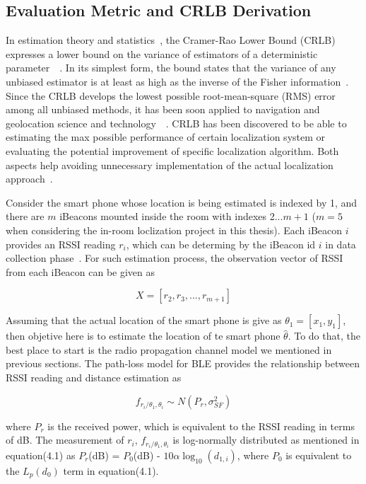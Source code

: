 \documentclass[12pt]{report}
\begin{document}
\subsection{Evaluation Metric and CRLB Derivation}
In estimation theory and statistics~\cite{gen15b}, the Cramer-Rao Lower Bound (CRLB) expresses a lower bound on the variance of estimators of a deterministic parameter~\cite{tre}~\cite{poo}. In its simplest form, the bound states that the variance of any unbiased estimator is at least as high as the inverse of the Fisher information~\cite{poo}. Since the CRLB develops the lowest possible root-mean-square (RMS) error among all unbiased methods, it has been soon applied to navigation and geolocation science and technology~\cite{pat05}~\cite{gus}. CRLB has been discovered to be able to estimating the max possible performance of certain localization system or evaluating the potential improvement of specific localization algorithm. Both aspects help avoiding unnecessary implementation of the actual localization approach~\cite{pat03}.

Consider the smart phone whose location is being estimated is indexed by 1, and there are $m$ iBeacons mounted inside the room with indexes 2...$m + 1$ ($m = 5$ when considering the in-room loclization project in this thesis). Each iBeacon $i$ provides an RSSI reading $r_i$, which can be determing by the iBeacon id $i$ in data collection phase~\cite{ye13}. For such estimation process, the observation vector of RSSI from each iBeacon can be given as 

\begin{equation}
X = [r_2, r_3, ..., r_{m + 1}]
\end{equation}

Assuming that the actual location of the smart phone is give as $\theta_1 = [x_1, y_1]$, then objetive here is to estimate the location of te smart phone $\hat{\theta}$. To do that, the best place to start is the radio propagation channel model we mentioned in previous sections. The path-loss model for BLE provides the relationship between RSSI reading and distance estimation as

\begin{equation}
f_{r_i/ \theta_1,\theta_i} \sim N(P_r, \sigma^2_{SF})
\end{equation}

where $P_r$ is the received power, which is equivalent to the RSSI reading in terms of dB. The measurement of $r_i$, $f_{r_i/ \theta_1,\theta_i}$ is log-normally distributed as mentioned in equation(4.1) as $P_r$(dB) = $P_0$(dB) - $10\alpha\log_{10} (d_{1,i})$, where $P_0$ is equivalent to the $L_p (d_0)$ term in equation(4.1). 
\end{document}
